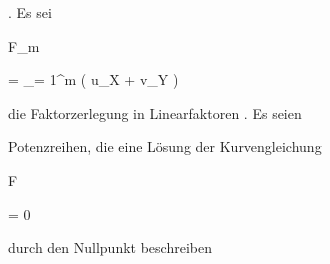 {{{{   }{
}

}
{}{}{.}
Es sei


\mavergleichskettedisp

{\vergleichskette

{ F_m
}

{ =} { \prod_{\lambda = 1}^{m} ( u_\lambda X + v_\lambda Y )
}

{ } {
}

{ } {
}

{ } {
}

}
{}{}{}
die Faktorzerlegung in Linearfaktoren
 {} {.}
Es seien


 {  }


Potenzreihen, die eine Lösung der Kurvengleichung


\mavergleichskette

{\vergleichskette

{F
}

{ = }{ 0
}

{  }{
}

{    }{
}

{   }{
}

}
{}{}{}
durch den Nullpunkt beschreiben
}}
